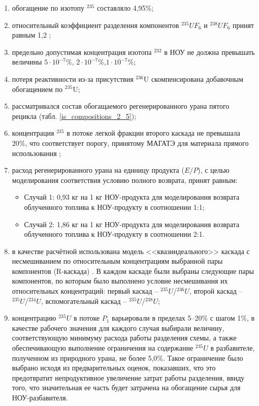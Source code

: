 \begin{enumerate}
    \item обогащение по изотопу $^{235}$ составляло 4,95\%;
    \item относительный коэффициент разделения компонентов $^{235}UF_6$ и $^{238}UF_6$ принят равным 1,2 \cite{smirnovEvolutionIsotopicComposition2012};
    \item предельно допустимая концентрация изотопа $^{232}$ в НОУ не должна превышать величины $5\cdot10^{-7}$\%, $2\cdot10^{-7}$\%,$1\cdot10^{-7}$\%;
    \item потеря реактивности из-за присутствия $^{236}$U скомпенсирована добавочным обогащением по $^{235}$U;
    \item рассматривался состав обогащаемого регенерированного урана пятого рецикла (табл. \ref{is_compositions_2_5});
    \item концентрация $^{235}$  в потоке легкой фракции второго каскада не превышала 20\%, что соответствует порогу, принятому МАГАТЭ для материала прямого использования \cite{alekseevConceptUseRecycled2010};
    \item расход регенерированного урана на единицу продукта ($E / P$), с целью моделирования соответствия условию полного возврата, принят равным:
    \begin{itemize}
        \item Случай 1: 0,93 кг на 1 кг НОУ-продукта для моделирования возврата облученного топлива к НОУ-продукту в соотношении 1:1;
        \item Случай 2: 1,86 кг на 1 кг НОУ-продукта для моделирования возврата облученного топлива к НОУ-продукту в соотношении 2:1.
    \end{itemize}
    \item в качестве расчётной использована модель <<квазиидеального>> каскада \cite{sazykinKvaziidealnyeKaskadyDlya2000} с несмешиванием по относительным концентрациям выбранной пары компонентов (R-каскада) \cite{sulaberidzeTeoriyaKaskadovDlya2011}. В каждом каскаде были выбраны следующие пары компонентов, по которым было выполнено условие несмешивания их относительных концентраций: первый каскад -- $^{235}U$/$^{236}U$, второй каскад -- $^{235}U$/$^{234}U$, вспомогательный каскад -- $^{235}U$/$^{238}U$;
    \item концентрацию $^{235}U$ в потоке $P_1$ варьировали в пределах 5--20\% с шагом 1\%, в качестве рабочего значения для каждого случая выбирали величину, соответствующую минимуму расхода работы разделения схемы, а также обеспечивающую выполнение ограничения на содержание $^{235}U$ в разбавителе, полученном из природного урана, не более 5,0\%. Такое ограничение было выбрано исходя из предварительных оценок, показавших, что это предотвратит непродуктивное увеличение затрат работы разделения, ввиду того, что значительная ее часть будет затрачена на обогащение сырья для НОУ-разбавителя.
\end{enumerate}

